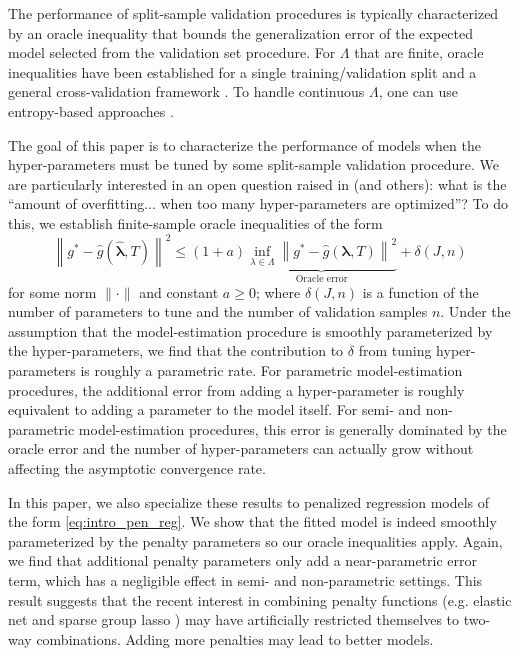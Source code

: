 \documentclass[12pt]{article}
\begin{document}
The performance of split-sample validation procedures is typically characterized by an oracle inequality that bounds the generalization error of the expected model selected from the validation set procedure. For $\Lambda$ that are finite, oracle inequalities have been established for a single training/validation split \citet{gyorfi2006distribution} and a general cross-validation framework \citep{van2003unified, van2004asymptotic}. To handle continuous $\Lambda$, one can use entropy-based approaches \citep{lecue2012oracle}. 

The goal of this paper is to characterize the performance of models when the hyper-parameters must be tuned by some split-sample validation procedure. We are particularly interested in an open question raised in \citet{bengio2000gradient} (and others): what is the ``amount of overfitting... when too many hyper-parameters are optimized''? To do this, we establish finite-sample oracle inequalities of the form
\begin{equation}
\label{thrm:intro_oracle_ineq}
\left \| g^* - \hat{g}\left (\hat{\boldsymbol{\lambda}}, T \right ) \right \|^2
\le
(1+a)
\underbrace{\inf_{\lambda \in \Lambda} \left \| g^* - \hat{g}\left (\boldsymbol{\lambda} , T \right ) \right \|^2}_{\text{Oracle error}}
+ \delta\left(J,n\right)
\end{equation}
for some norm $\| \cdot \|$ and constant $a \ge 0$; where $\delta(J,n)$ is a function of the number of parameters to tune and the number of validation samples $n$. Under the assumption that the model-estimation procedure is smoothly parameterized by the hyper-parameters, we find that the contribution to $\delta$ from tuning hyper-parameters is roughly a parametric rate. For parametric model-estimation procedures, the additional error from adding a hyper-parameter is roughly equivalent to adding a parameter to the model itself. For semi- and non-parametric model-estimation procedures, this error is generally dominated by the oracle error and the number of hyper-parameters can actually grow without affecting the asymptotic convergence rate.

In this paper, we also specialize these results to penalized regression models of the form \eqref{eq:intro_pen_reg}. We show that the fitted model is indeed smoothly parameterized by the penalty parameters so our oracle inequalities apply. Again, we find that additional penalty parameters only add a near-parametric error term, which has a negligible effect in semi- and non-parametric settings. This result suggests that the recent interest in combining penalty functions (e.g. elastic net and sparse group lasso \citep{zou2003regression, simon2013sparse}) may have artificially restricted themselves to two-way combinations. Adding more penalties may lead to better models.
\end{document}
